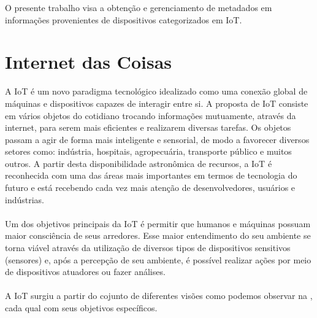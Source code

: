 O presente trabalho visa a obtenção e gerenciamento de metadados em informações provenientes de
dispositivos categorizados em \acrfull{IoT}. %


\section{Internet das Coisas}%
A \acrlong{IoT} é um novo paradigma tecnológico idealizado como uma conexão global
de máquinas e dispositivos capazes de interagir entre si. A proposta de \acrshort{IoT} consiste em vários objetos do cotidiano trocando informações
mutuamente, através da internet, para serem mais eficientes e realizarem diversas tarefas.
Os objetos passam a agir de forma mais inteligente e sensorial, de modo a favorecer diversos setores como:
indústria, hospitais, agropecuária, transporte público e muitos outros. A partir desta
disponibilidade astronômica de recursos, a \acrshort{IoT} é reconhecida com uma das áreas mais importantes
em termos de tecnologia do futuro e está recebendo cada vez mais atenção de desenvolvedores, usuários e indústrias.
\\\\Um dos objetivos principais da \acrlong{IoT} é permitir
que humanos e máquinas possuam maior consciência de seus arredores.
 Esse maior entendimento do seu ambiente se torna viável através da utilização
 de diversos tipos de dispositivos sensitivos (sensores) e, após a percepção
 de seu ambiente, é possível realizar ações por meio de dispositivos atuadores ou fazer análises.\\\\
 A \acrlong{IoT} surgiu a partir do cojunto de diferentes visões como podemos observar na , cada qual com seus objetivos específicos.
